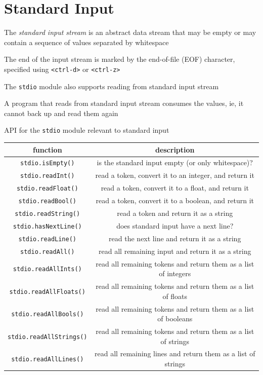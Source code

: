 \documentclass[8pt,a4paper,compress]{beamer}
\begin{document}
\section{Standard Input}
\begin{frame}[fragile]
The \emph{standard input stream} is an abstract data stream that may be empty or may contain a sequence of values separated by whitespace 

\bigskip

The end of the input stream is marked by the end-of-file (EOF) character, specified using \lstinline$<ctrl-d>$ or \lstinline$<ctrl-z>$ 

\bigskip

The \lstinline{stdio} module also supports reading from standard input stream

\bigskip

A program that reads from standard input stream consumes the values, ie, it cannot back up and read them again
\end{frame}

\begin{frame}[fragile]
API for the \lstinline$stdio$ module relevant to standard input
\begin{center}
\begin{tabular}{cc}
function & description \\ \hline
\lstinline$stdio.isEmpty()$ & is the standard input empty (or only whitespace)? \\
\lstinline$stdio.readInt()$ & read a token, convert it to an integer, and return it \\
\lstinline$stdio.readFloat()$ & read a token, convert it to a float, and return it \\
\lstinline$stdio.readBool()$ & read a token, convert it to a boolean, and return it \\
\lstinline$stdio.readString()$ & read a token and return it as a string \\
\lstinline$stdio.hasNextLine()$ & does standard input have a next line? \\
\lstinline$stdio.readLine()$ & read the next line and return it as a string \\
\lstinline$stdio.readAll()$ & read all remaining input and return it as a string \\
\lstinline$stdio.readAllInts()$ & read all remaining tokens and return them as a list of integers \\
\lstinline$stdio.readAllFloats()$ & read all remaining tokens and return them as a list of floats \\
\lstinline$stdio.readAllBools()$ & read all remaining tokens and return them as a list of booleans \\
\lstinline$stdio.readAllStrings()$ & read all remaining tokens and return them as a list of strings \\
\lstinline$stdio.readAllLines()$ & read all remaining lines and return them as a list of strings
\end{tabular} 
\end{center}
\end{frame}
\end{document}
